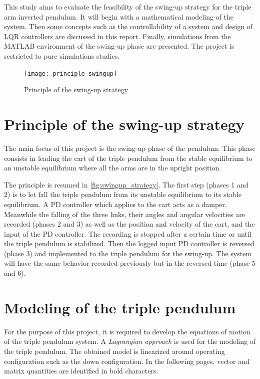 \documentclass[a4paper,12pt]{article}
\begin{document}
This study aims to evaluate the feasibility of the swing-up strategy for the triple arm inverted pendulum. It will begin with a mathematical modeling of the system. Then some concepts such as the controllability of a system and design of LQR controllers are discussed in this report. Finally, simulations from the MATLAB environment of the swing-up phase are presented. The project is restricted to pure simulations studies.

\begin{figure}[ht]
	\centering
	\texttt{[image: principle\_swingup]}
	\caption{Principle of the swing-up strategy}
	\label{fig:swingup_strategy}
\end{figure}
\section{Principle of the swing-up strategy}
The main focus of this project is the swing-up phase of the pendulum. This phase consists in leading the cart of the triple pendulum from the stable equilibrium to an unstable equilibrium where all the arms are in the upright position.

The principle is resumed in \autoref{fig:swingup_strategy}. The first step (phases 1 and 2) is to let fall the triple pendulum from its unstable equilibrium to its stable equilibrium. A PD controller which applies to the cart acts as a damper. Meanwhile the falling of the three links, their angles and angular velocities are recorded (phases 2 and 3) as well as the position and velocity of the cart, and the input of the PD controller. The recording is stopped after a certain time or until the triple pendulum is stabilized. Then the logged input PD controller is reversed (phase 3) and implemented to the triple pendulum for the swing-up. The system will have the same behavior recorded previously but in the reversed time (phase 5 and 6).

\section{Modeling of the triple pendulum}
For the purpose of this project, it is required to develop the equations of motion of the triple pendulum system. A \emph{Lagrangian approach} is used for the modeling of the triple pendulum. The obtained model is linearized around operating configuration such as the down configuration. In the following pages, vector and matrix quantities are identified in bold characters.
\end{document}
